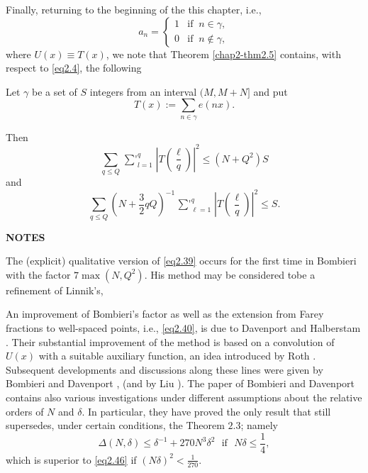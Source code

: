 Finally, returning to the beginning of the this chapter, i.e.,
\begin{equation*}
a_n=
\begin{cases}
1 &  \text{if }~ n\in \gamma,\\
0 & \text{if }~ n\notin \gamma,
\end{cases} \tag{2.88}
\end{equation*}
where $U(x)\equiv T(x)$, we note that Theorem \ref{chap2-thm2.5}
contains, with respect to \eqref{eq2.4}, the following 

\begin{theorem}\label{chap2-thm2.6}
Let $\gamma$ be a set of $S$ integers from an interval $(M, M+N]$ and put
\begin{equation*}
T(x):=\sum_{n \in \gamma}e(nx). \tag{2.89}\label{eq2.89}
\end{equation*}
\end{theorem}

Then
\begin{equation*}
\sum_{q \leq Q} \mathop{\sum{}'}_{l=1}^{q}\left|T(\frac{\ell}{q})\right|^2 \leq
(N+Q^2)S \tag{2.90}\label{eq2.90}
\end{equation*}
and
\begin{equation*}
\sum_{q \leq Q}(N+\frac{3}{2}qQ)^{-1}
    \mathop{\sum{}'}_{\ell=1}^{q}\left|T(\frac{\ell}{q})\right|^2\leq
    S. \tag{2.91}\label{eq2.91}  
\end{equation*}

\medskip
\begin{center}
{\bf NOTES}
\end{center}

The (explicit) qualitative version of \eqref{eq2.39} occurs for the first
time in Bombieri \cite{key1} with the factor $7\max (N,Q^2)$. His method
may be considered to\pageoriginale be a refinement of Linnik's, 

An improvement of Bombieri's factor as well as the extension from
Farey fractions to well-spaced points, i.e., \eqref{eq2.40}, is due to
Davenport and Halberstam \cite{key1}. Their substantial improvement of the
method is based on a convolution of $U(x)$ with a suitable auxiliary
function, an idea introduced by Roth \cite{key2}. Subsequent developments
and discussions along these lines were given by Bombieri and Davenport
\cite{key2}, \cite{key3} (and by Liu \cite{key1}). The paper of
Bombieri and Davenport \cite{key3} contains also various
investigations under different assumptions 
about the relative orders of $N$ and $\delta$. In particular, they
have proved the only result that still supersedes, under certain
conditions, the Theorem $2.3$; namely 
\begin{equation*}
\Delta (N, \delta)\leq \delta^{-1}+270 N^3 \delta^2 \text{~ if~ } N
\delta \leq \frac{1}{4}, \tag{2.92}\label{eq2.92} 
\end{equation*}
which is superior to \eqref{eq2.46} if $(N \delta)^2 < \frac{1}{270}$.

